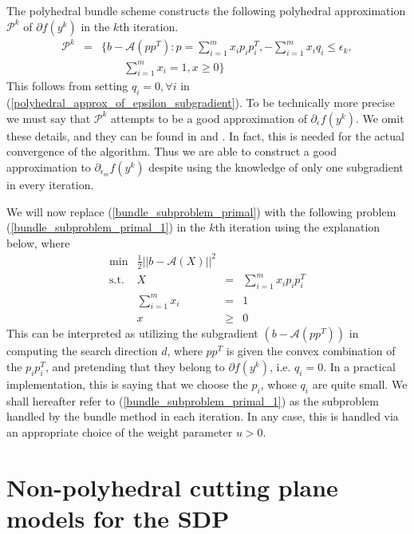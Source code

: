 \documentclass[12pt]{kluwer}
\begin{document}
\begin{article}
The polyhedral bundle scheme constructs the following polyhedral
approximation $\mathcal{P}^k$ of $\partial f(y^k)$ in the $k$th iteration.
\begin{equation}
\label{polyhedral_approx_of_epsilon_subgradient}
\begin{array}{rcl}
\mathcal{P}^k & = & \{ b - \mathcal{A}(pp^T) : p = 
\sum_{i=1}^mx_ip_ip_i^T, 
-\sum_{i=1}^mx_iq_i \le \epsilon_k, \\
&& \qquad \sum_{i=1}^mx_i = 1, x \ge 0 \}
\end{array}
\end{equation}
This follows from setting $q_i = 0, \forall i$ in (\ref{polyhedral_approx_of_epsilon_subgradient}). To be
technically more precise we must say that $\mathcal{P}^k$ attempts to be a good approximation of
$\partial_{\epsilon} f(y^k)$. We omit these details, and they can be found in
 and . In fact, this is needed
for the actual convergence of the algorithm. 
Thus we are able to construct a good approximation to $\partial_{\epsilon_m}f(y^k)$ despite using the
knowledge of only one subgradient in every iteration.

We will now replace (\ref{bundle_subproblem_primal}) with the following problem 
(\ref{bundle_subproblem_primal_1}) in the $k$th iteration using the explanation below, where
\begin{equation}
\label{bundle_subproblem_primal_1}
\begin{array}{lrcc}
\min & \frac{1}{2}||b - \mathcal{A}(X)||^2 \\
\mbox{s.t.} & X & = & \sum_{i=1}^mx_ip_ip_i^T \\
& \sum_{i=1}^mx_i & = & 1 \\
& x & \ge & 0
\end{array}
\end{equation}
This can be interpreted as utilizing the subgradient $(b - \mathcal{A}(pp^T))$ in computing the search
direction $d$, where $pp^T$ is given the convex combination of the $p_ip_i^T$, and pretending that
they belong to $\partial f(y^k)$, i.e. $q_i = 0$. In a practical implementation, this is saying that
we choose the $p_i$, whose $q_i$ are quite small. We shall hereafter refer to (\ref{bundle_subproblem_primal_1})
as the subproblem handled by the bundle method in each iteration. In any case, this is handled via an appropriate
choice of the weight parameter $u >0$.

\section{Non-polyhedral cutting plane models for the SDP}


\end{article}
\end{document}
